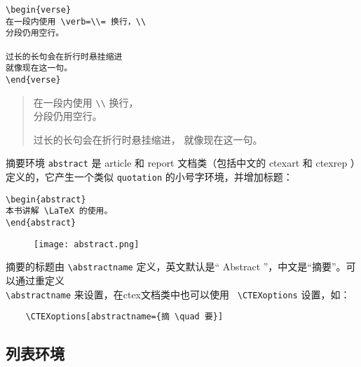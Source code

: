 \begin{minipage}[t]{0.45\textwidth}
\begin{lstlisting}
\begin{verse}
在一段内使用 \verb=\\= 换行，\\
分段仍用空行。

过长的长句会在折行时悬挂缩进
就像现在这一句。
\end{verse}
\end{lstlisting}
\end{minipage}
\hfill
\begin{minipage}[t]{0.45\textwidth}
    \begin{verse}
        在一段内使用 \verb=\\= 换行，\\
        分段仍用空行。
        
        过长的长句会在折行时悬挂缩进，
        就像现在这一句。
    \end{verse}
\end{minipage}

摘要环境 \verb|abstract| 是 article 和 report 文档类（包括中文的 ctexart 和 ctexrep ）定义的，它产生一个类似 \verb|quotation| 的小号字环境，并增加标题：

\begin{minipage}[t]{0.45\textwidth}
\begin{lstlisting}
\begin{abstract}
本书讲解 \LaTeX 的使用。
\end{abstract}
\end{lstlisting}
\end{minipage}
\hfill
\begin{minipage}[t]{0.45\textwidth}
\begin{figure}[H]
    \centering
    \texttt{[image: abstract.png]}
\end{figure}
\end{minipage}

摘要的标题由 \verb|\abstractname| 定义，英文默认是“ Abstract ”，中文是“摘要”。可以通过重定义 \\
\verb|\abstractname| 来设置，在ctex文档类中也可以使用 \verb| \CTEXoptions| 设置，如：

\begin{lstlisting}
    \CTEXoptions[abstractname={摘 \quad 要}]
\end{lstlisting}

\subsection{列表环境}

